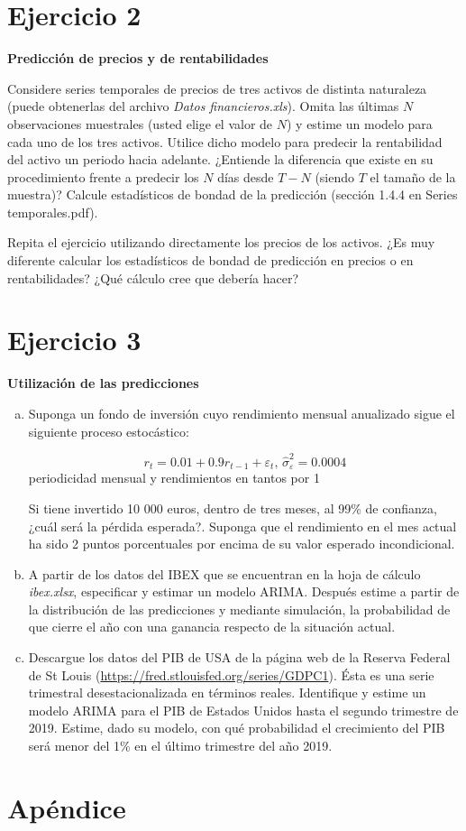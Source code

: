 \documentclass[12pt]{article}
\begin{document}
\section{Ejercicio 2}

\textbf{Predicción de precios y de rentabilidades}

Considere series temporales de precios de tres activos de distinta naturaleza (puede obtenerlas del archivo \textit{Datos financieros.xls}). Omita las últimas $N$ observaciones muestrales (usted elige el valor de $N$) y estime un modelo para cada uno de los tres activos. Utilice dicho modelo para predecir la rentabilidad del activo un periodo hacia adelante. ¿Entiende la diferencia que existe en su procedimiento frente a predecir los $N$ días desde $T-N$ (siendo $T$ el tamaño de la muestra)? Calcule estadísticos de bondad de la predicción (sección 1.4.4 en Series temporales.pdf).  

Repita el ejercicio utilizando directamente los precios de los activos. ¿Es muy diferente calcular los estadísticos de bondad de predicción en precios o en rentabilidades? ¿Qué cálculo cree que debería hacer?

\section{Ejercicio 3}

\textbf{Utilización de las predicciones}

\begin{enumerate}[a)]
    \item Suponga un fondo de inversión cuyo rendimiento mensual anualizado sigue el siguiente proceso estocástico:
    
    \[
    r_t = 0.01 + 0.9r_{t-1} + \varepsilon_t, \, \hat{\sigma}_\varepsilon^2 = 0.0004
    \]
    periodicidad mensual y rendimientos en tantos por 1
    
    Si tiene invertido 10 000 euros, dentro de tres meses, al 99\% de confianza, ¿cuál será la pérdida esperada?. Suponga que el rendimiento en el mes actual ha sido 2 puntos porcentuales por encima de su valor esperado incondicional.
    
    \item A partir de los datos del IBEX que se encuentran en la hoja de cálculo \textit{ibex.xlsx}, especificar y estimar un modelo ARIMA. Después estime a partir de la distribución de las predicciones y mediante simulación, la probabilidad de que cierre el año con una ganancia respecto de la situación actual.
    
    \item Descargue los datos del PIB de USA de la página web de la Reserva Federal de St Louis (\url{https://fred.stlouisfed.org/series/GDPC1}). Ésta es una serie trimestral desestacionalizada en términos reales. Identifique y estime un modelo ARIMA para el PIB de Estados Unidos hasta el segundo trimestre de 2019. Estime, dado su modelo, con qué probabilidad el crecimiento del PIB será menor del 1\% en el último trimestre del año 2019.
\end{enumerate}



\clearpage
\appendix

\section{Apéndice}
\end{document}
